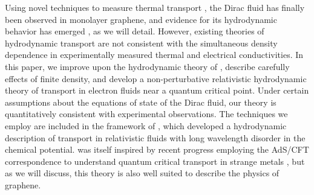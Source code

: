 \documentclass[10pt, oneside]{book}
\begin{document}
\begin{doublespace}
Using novel techniques to measure thermal transport \cite{fong, fong2, crossno2},  the Dirac fluid has finally been  observed in monolayer graphene, and evidence for its hydrodynamic behavior  has emerged \cite{Crossno1058}, as we will detail.  However, existing theories of hydrodynamic transport are not consistent with the simultaneous density dependence in experimentally measured thermal and electrical conductivities.   In this paper, we improve upon the hydrodynamic theory of \cite{hkms}, describe carefully effects of finite density, and develop a non-perturbative relativistic hydrodynamic theory of transport in electron fluids near a quantum critical point.   Under certain assumptions about the equations of state of the Dirac fluid, our theory is quantitatively consistent with experimental observations.   The techniques we employ are included in the framework of \cite{Lucas:2015lna}, which developed a hydrodynamic description of transport in relativistic fluids with long wavelength disorder in the chemical potential.   \cite{Lucas:2015lna} was itself inspired by recent progress employing the AdS/CFT correspondence to understand quantum critical transport in strange metals \cite{Blake:2013owa, Davison:2013txa, Balasubramanian:2013yqa, lucas1401, Lucas:2015vna, Davison:2015bea, Blake:2015epa, Donos:2015gia,  Grozdanov:2015qia}, but as we will discuss, this theory is also well suited to describe the physics of graphene.




\end{doublespace}
\end{document}
